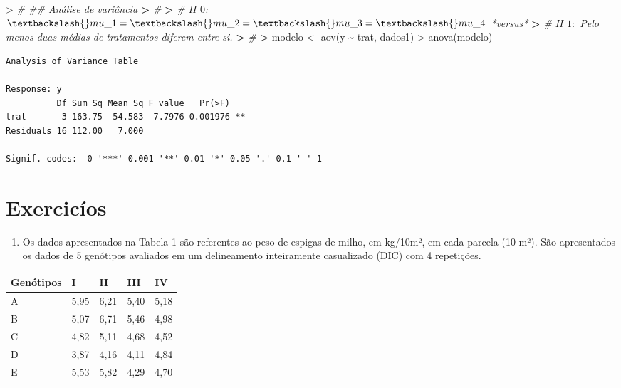 \documentclass[
]{book}
\newenvironment{Shaded}{\begin{snugshade}}{\end{snugshade}}
\newcommand{\CommentTok}[1]{\textcolor[rgb]{0.56,0.35,0.01}{\textit{#1}}}
\newcommand{\ErrorTok}[1]{\textcolor[rgb]{0.64,0.00,0.00}{\textbf{#1}}}
\newcommand{\FunctionTok}[1]{\textcolor[rgb]{0.00,0.00,0.00}{#1}}
\newcommand{\NormalTok}[1]{#1}
\newcommand{\OtherTok}[1]{\textcolor[rgb]{0.56,0.35,0.01}{#1}}
\newcommand{\SpecialCharTok}[1]{\textcolor[rgb]{0.00,0.00,0.00}{#1}}
\providecommand{\tightlist}{%
  \setlength{\itemsep}{0pt}\setlength{\parskip}{0pt}}
\begin{document}
\begin{Shaded}
\begin{Highlighting}[]
\SpecialCharTok{\textgreater{}} \CommentTok{\#\textquotesingle{} \#\# Análise de variância  }
\ErrorTok{\textgreater{}} \CommentTok{\#\textquotesingle{} }
\ErrorTok{\textgreater{}} \CommentTok{\#\textquotesingle{} $H\_0$: $\textbackslash{}mu\_1 = \textbackslash{}mu\_2 = \textbackslash{}mu\_3 = \textbackslash{}mu\_4$ *versus* }
\ErrorTok{\textgreater{}} \CommentTok{\#\textquotesingle{} $H\_1:$ Pelo menos duas médias de tratamentos diferem entre si.}
\ErrorTok{\textgreater{}} \CommentTok{\#\textquotesingle{} }
\ErrorTok{\textgreater{}}\NormalTok{ modelo }\OtherTok{\textless{}{-}} \FunctionTok{aov}\NormalTok{(y }\SpecialCharTok{\textasciitilde{}}\NormalTok{ trat, dados1)}
\SpecialCharTok{\textgreater{}} \FunctionTok{anova}\NormalTok{(modelo)}
\end{Highlighting}
\end{Shaded}

\begin{verbatim}
Analysis of Variance Table

Response: y
          Df Sum Sq Mean Sq F value   Pr(>F)   
trat       3 163.75  54.583  7.7976 0.001976 **
Residuals 16 112.00   7.000                    
---
Signif. codes:  0 '***' 0.001 '**' 0.01 '*' 0.05 '.' 0.1 ' ' 1
\end{verbatim}

\hypertarget{exercicuxedos-2}{%
\section{Exercicíos}\label{exercicuxedos-2}}

\begin{enumerate}
\def\labelenumi{\arabic{enumi})}
\tightlist
\item
  Os dados apresentados na Tabela 1 são referentes ao peso de espigas de milho, em kg/10m², em cada parcela (10 m²). São apresentados os dados de 5 genótipos avaliados em um delineamento inteiramente casualizado (DIC) com 4 repetições.
\end{enumerate}

\begin{longtable}[]{@{}lllll@{}}
\toprule()
Genótipos & I & II & III & IV \\
\midrule()
\endhead
A & 5,95 & 6,21 & 5,40 & 5,18 \\
B & 5,07 & 6,71 & 5,46 & 4,98 \\
C & 4,82 & 5,11 & 4,68 & 4,52 \\
D & 3,87 & 4,16 & 4,11 & 4,84 \\
E & 5,53 & 5,82 & 4,29 & 4,70 \\
\bottomrule()
\end{longtable}
\end{document}
